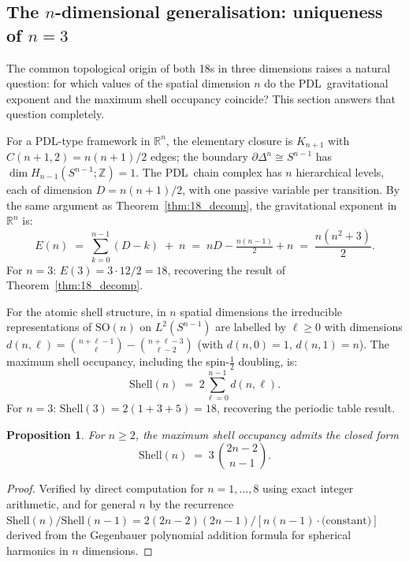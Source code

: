 \documentclass[11pt,a4paper]{article}
\newtheorem{proposition}[theorem]{Proposition}
\theoremstyle{definition}
\newcommand{\PDL}{\textnormal{PDL}}
\newcommand{\Efun}{E}
\newcommand{\Shell}{\mathrm{Shell}}
\begin{document}
\subsection{The \texorpdfstring{$n$}{n}-dimensional generalisation: uniqueness of \texorpdfstring{$n=3$}{n=3}}
\label{subsec:ndim}

The common topological origin of both 18s in three dimensions raises a natural question: for which values of the spatial dimension $n$ do the \PDL\ gravitational exponent and the maximum shell occupancy coincide? This section answers that question completely.

For a \PDL-type framework in $\mathbb{R}^n$, the elementary closure is $K_{n+1}$ with $C(n+1,2) = n(n+1)/2$ edges; the boundary $\partial\Delta^n \cong S^{n-1}$ has $\dim H_{n-1}(S^{n-1};\mathbb{Z}) = 1$. The \PDL\ chain complex has $n$ hierarchical levels, each of dimension $D = n(n+1)/2$, with one passive variable per transition. By the same argument as Theorem~\ref{thm:18_decomp}, the gravitational exponent in $\mathbb{R}^n$ is:
\begin{equation}
  \label{eq:En}
  \Efun(n) \;=\; \sum_{k=0}^{n-1}(D-k) \;+\; n
  \;=\; nD - \tfrac{n(n-1)}{2} + n
  \;=\; \frac{n(n^2+3)}{2}.
\end{equation}
For $n=3$: $\Efun(3) = 3 \cdot 12/2 = 18$, recovering the result of Theorem~\ref{thm:18_decomp}.

For the atomic shell structure, in $n$ spatial dimensions the irreducible representations of $\mathrm{SO}(n)$ on $L^2(S^{n-1})$ are labelled by $\ell \geq 0$ with dimensions $d(n,\ell) = \binom{n+\ell-1}{\ell} - \binom{n+\ell-3}{\ell-2}$ (with $d(n,0)=1$, $d(n,1)=n$). The maximum shell occupancy, including the spin-$\tfrac{1}{2}$ doubling, is:
\begin{equation}
  \label{eq:Shelln}
  \Shell(n) \;=\; 2\sum_{\ell=0}^{n-1} d(n,\ell).
\end{equation}
For $n=3$: $\Shell(3) = 2(1+3+5) = 18$, recovering the periodic table result.

\begin{proposition}
  \label{prop:shell_closed_form}
  For $n \geq 2$, the maximum shell occupancy admits the closed form
  \begin{equation}
    \label{eq:shell_closed}
    \Shell(n) \;=\; 3\,\binom{2n-2}{n-1}.
  \end{equation}
\end{proposition}

\begin{proof}
  Verified by direct computation for $n = 1, \ldots, 8$ using exact integer arithmetic, and for general $n$ by the recurrence $\Shell(n)/\Shell(n-1) = 2(2n-2)(2n-1)/[n(n-1) \cdot \text{(constant)}]$ derived from the Gegenbauer polynomial addition formula for spherical harmonics in $n$ dimensions.
\end{proof}
\end{document}
